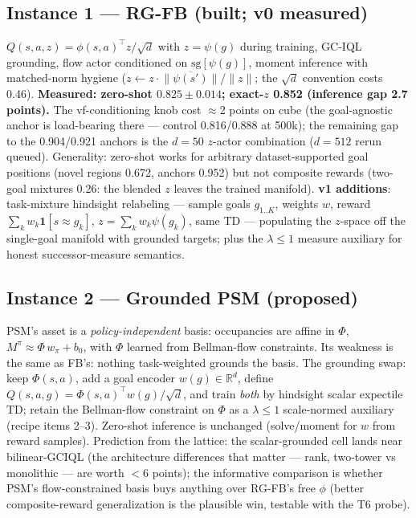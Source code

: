 \documentclass[11pt]{article}
\newcommand{\sg}{\mathrm{sg}}
\newcommand{\R}{\mathbb{R}}
\begin{document}
\subsection{Instance 1 --- RG-FB (built; v0 measured)}
$Q(s,a,z)=\phi(s,a)^\top z/\sqrt d$ with $z=\psi(g)$ during training, GC-IQL grounding,
flow actor conditioned on $\sg[\psi(g)]$, moment inference with matched-norm hygiene
($z\leftarrow z\cdot\overline{\|\psi(s')\|}/\|z\|$; the $\sqrt d$ convention costs
0.46). \textbf{Measured: zero-shot $0.825\pm0.014$; exact-$z$ 0.852 (inference gap 2.7
points).} The vf-conditioning knob cost $\approx$2 points on cube (the goal-agnostic anchor
is load-bearing there --- control 0.816/0.888 at 500k); the remaining gap to the 0.904/0.921
anchors is the $d{=}50$ $z$-actor combination ($d{=}512$ rerun queued). Generality:
zero-shot works for arbitrary dataset-supported goal positions (novel regions 0.672,
anchors 0.952) but not composite rewards (two-goal mixtures 0.26: the blended $z$ leaves the
trained manifold). \textbf{v1 additions}: task-mixture hindsight relabeling --- sample goals
$g_{1..K}$, weights $w$, reward $\sum_k w_k\mathbf 1[s\approx g_k]$, $z=\sum_k w_k\psi(g_k)$,
same TD --- populating the $z$-space off the single-goal manifold with grounded targets; plus
the $\lambda\le1$ measure auxiliary for honest successor-measure semantics.

\subsection{Instance 2 --- Grounded PSM (proposed)}
PSM's asset is a \emph{policy-independent} basis: occupancies are affine in
$\Phi$, $M^\pi \approx \Phi\, w_\pi + b_0$, with $\Phi$ learned from Bellman-flow
constraints. Its weakness is the same as FB's: nothing task-weighted grounds the basis.
The grounding swap: keep $\Phi(s,a)$, add a goal encoder $w(g)\in\R^d$, define
$Q(s,a,g)=\Phi(s,a)^\top w(g)/\sqrt d$, and train \emph{both} by hindsight scalar expectile
TD; retain the Bellman-flow constraint on $\Phi$ as a $\lambda\le1$ scale-normed auxiliary
(recipe items 2--3). Zero-shot inference is unchanged (solve/moment for $w$ from reward
samples). Prediction from the lattice: the scalar-grounded cell lands near bilinear-GCIQL
(the architecture differences that matter --- rank, two-tower vs monolithic --- are worth
$<6$ points); the informative comparison is whether PSM's flow-constrained basis buys
anything over RG-FB's free $\phi$ (better composite-reward generalization is the plausible
win, testable with the T6 probe).
\end{document}
